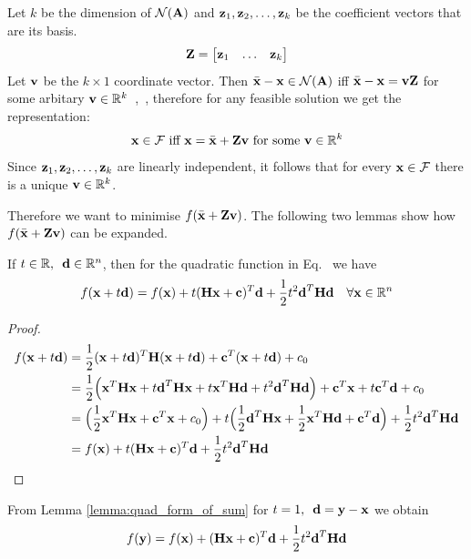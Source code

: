 \documentclass[a4paper]{article}
\numberwithin{equation}{section} %
\newcounter{solution}
\newcommand{\setR}{\mathbb{R}} %
\newcommand{\setRn}{\mathbb{R}^n} %
\newcommand{\hquad}{\hskip0.5em\relax}%
\newcommand{\B}[1]{\textbf{\textup{#1}}} %
\renewcommand{\eqref}{Eq.~\originaleqref}
\renewcommand*{\eqref}[1]{Eq.~\originaleqref{#1}}
\begin{document}
Let $k$  be the dimension of $\mathcal{N}(\B{A})$ and $\B{z}_1,\B{z}_2,\ldots, \B{z}_k$ be the coefficient vectors that are its basis. 
\[
\B{Z}=\begin{bmatrix} \B{z}_1 & \ldots & \B{z}_k \end{bmatrix}
\]
Let $\B{v}$ be the $k \times 1$ coordinate vector. Then $\bar{\B{x}} - \B{x} \in \mathcal{N}(\B{A}) $ iff $\bar{\B{x}} - \B{x} = \B{vZ}$ for some arbitary $\B{v} \in \setR^k$~\cite{lec_notes_wang},~\cite{book_bunch}, therefore for any feasible solution we get the representation:
\[
\B{x} \in \mathcal{F} \textup{ iff } \B{x} = \bar{\B{x}} + \B{Zv} \textup{ for some } \B{v} \in \setR^k
\]
Since $\B{z}_1,\B{z}_2,\ldots, \B{z}_k$ are linearly independent, it follows that for every $\B{x} \in \mathcal{F}$ there is a unique $\B{v} \in \setR^ k$.

Therefore we want to minimise $f( \bar{\B{x}} + \B{Zv})$. The following two lemmas show how $f( \bar{\B{x}} + \B{Zv})$ can be expanded.

\begin{lemma}
If $t \in \setR, \hquad \B{d} \in \setRn$, then for the quadratic function in  \eqref{eq:quadratic_full_vector} we have~\cite{lec_notes_sasane}
\begin{equation}
\nonumber
f(\B{x}+t\B{d}) = f(\B{x}) + t(\B{Hx}+\B{c})^T \B{d} + \frac{1}{2}t^2\B{d}^T\B{Hd} \quad \forall \B{x} \in \setRn
\end{equation}
\label{lemma:quad_form_of_sum}
\end{lemma}

\begin{proof}
\[
\begin{split}
f(\B{x}+t\B{d}) &= \frac{1}{2}(\B{x}+t\B{d})^T \B{H}(\B{x}+t\B{d}) + \B{c}^T (\B{x}+t\B{d})  + c_0 \\
&= \frac{1}{2}\Big(\B{x}^T\B{Hx} +t\B{d}^T\B{Hx} + t\B{x}^T\B{Hd} +t^2\B{d}^T\B{Hd} \Big) + \B{c}^T\B{x} + t\B{c}^T\B{d} + c_0 \\
&= \Big(\frac{1}{2}\B{x}^T\B{Hx}+\B{c}^T\B{x} + c_0\Big) + t\Big(\frac{1}{2}\B{d}^T\B{Hx} + \frac{1}{2}\B{x}^T \B{Hd} + \B{c}^T \B{d} \Big)+\frac{1}{2}t^2\B{d}^T\B{Hd}\\
&=f(\B{x}) + t(\B{Hx} + \B{c})^T\B{d} + \frac{1}{2} t^2 \B{d}^T\B{Hd}
\end{split}
\]
\end{proof}

\begin{lemma}
From Lemma \ref{lemma:quad_form_of_sum} for $t=1, \hquad \B{d}=\B{y} - \B{x}$ we obtain~\cite{lec_notes_sasane}
\[
f(\B{y}) = f(\B{x}) + (\B{Hx} + \B{c})^T \B{d} + \frac{1}{2}t^2\B{d}^T \B{Hd}
\]
\label{lemma:quad_form_of_diff}
\end{lemma}
\end{document}
